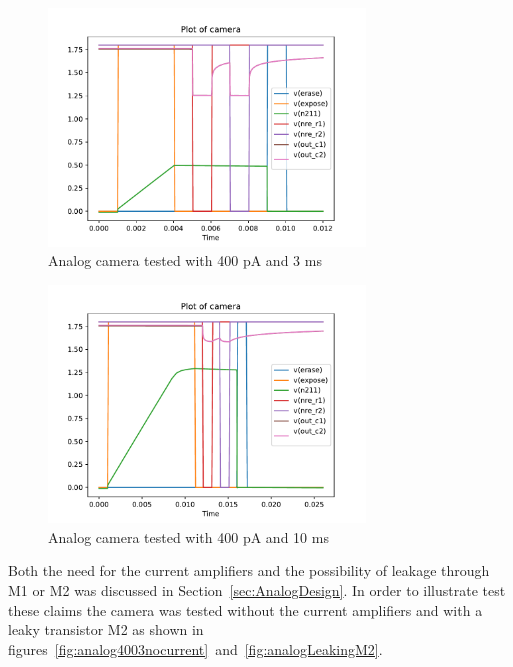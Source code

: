 \begin{figure}[H]
  \centering
  \includegraphics[width=0.75\textwidth]{../analog/camera4003typical}
  \caption{Analog camera tested with 400 pA and 3 ms}
  \label{fig:analog4003}
\end{figure}

\begin{figure}[H]
  \centering
  \includegraphics[width=0.75\textwidth]{../analog/camera40010overexposed}
  \caption{Analog camera tested with 400 pA and 10 ms}
  \label{fig:analog40010}
\end{figure}


Both the need for the current amplifiers and the possibility of leakage through M1 or M2 was discussed in Section~\ref{sec:AnalogDesign}.
In order to illustrate test these claims the camera was tested without the current amplifiers and with a leaky transistor M2 as shown in figures~\ref{fig:analog4003nocurrent}~and~\ref{fig:analogLeakingM2}.

